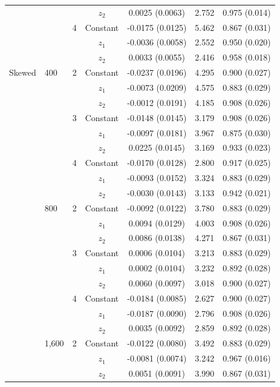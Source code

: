 \begin{tabular}{llccccc}
 &  &  & $z_2$ & 0.0025 (0.0063) & 2.752 & 0.975 (0.014) \\
\addlinespace
 &  & 4 & Constant & -0.0175 (0.0125) & 5.462 & 0.867 (0.031) \\
 &  &  & $z_1$ & -0.0036 (0.0058) & 2.552 & 0.950 (0.020) \\
 &  &  & $z_2$ & 0.0033 (0.0055) & 2.416 & 0.958 (0.018) \\
\addlinespace
Skewed & 400 & 2 & Constant & -0.0237 (0.0196) & 4.295 & 0.900 (0.027) \\
 &  &  & $z_1$ & -0.0073 (0.0209) & 4.575 & 0.883 (0.029) \\
 &  &  & $z_2$ & -0.0012 (0.0191) & 4.185 & 0.908 (0.026) \\
\addlinespace
 &  & 3 & Constant & -0.0148 (0.0145) & 3.179 & 0.908 (0.026) \\
 &  &  & $z_1$ & -0.0097 (0.0181) & 3.967 & 0.875 (0.030) \\
 &  &  & $z_2$ & 0.0225 (0.0145) & 3.169 & 0.933 (0.023) \\
\addlinespace
 &  & 4 & Constant & -0.0170 (0.0128) & 2.800 & 0.917 (0.025) \\
 &  &  & $z_1$ & -0.0093 (0.0152) & 3.324 & 0.883 (0.029) \\
 &  &  & $z_2$ & -0.0030 (0.0143) & 3.133 & 0.942 (0.021) \\
\addlinespace
 & 800 & 2 & Constant & -0.0092 (0.0122) & 3.780 & 0.883 (0.029) \\
 &  &  & $z_1$ & 0.0094 (0.0129) & 4.003 & 0.908 (0.026) \\
 &  &  & $z_2$ & 0.0086 (0.0138) & 4.271 & 0.867 (0.031) \\
\addlinespace
 &  & 3 & Constant & 0.0006 (0.0104) & 3.213 & 0.883 (0.029) \\
 &  &  & $z_1$ & 0.0002 (0.0104) & 3.232 & 0.892 (0.028) \\
 &  &  & $z_2$ & 0.0060 (0.0097) & 3.018 & 0.900 (0.027) \\
\addlinespace
 &  & 4 & Constant & -0.0184 (0.0085) & 2.627 & 0.900 (0.027) \\
 &  &  & $z_1$ & -0.0187 (0.0090) & 2.796 & 0.908 (0.026) \\
 &  &  & $z_2$ & 0.0035 (0.0092) & 2.859 & 0.892 (0.028) \\
\addlinespace
 & 1,600 & 2 & Constant & -0.0122 (0.0080) & 3.492 & 0.883 (0.029) \\
 &  &  & $z_1$ & -0.0081 (0.0074) & 3.242 & 0.967 (0.016) \\
 &  &  & $z_2$ & 0.0051 (0.0091) & 3.990 & 0.867 (0.031) \\

\end{tabular}
